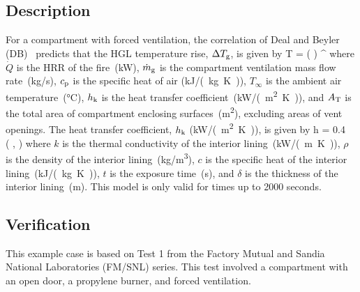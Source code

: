 \subsection*{Description}

For a compartment with forced ventilation, the correlation of Deal and Beyler (DB)~\cite{SFPE:Walton} predicts that the HGL temperature rise, $\Delta T\sb{g}$, is given by
\be
\Delta T = \left(  \right) \quad ^
\label{eq:DB}
\ee
where $\dot Q$ is the HRR of the fire~(\si{kW}), $\dot m\sb{g}$ is the compartment ventilation mass flow rate~(\si{kg/s}), $c\sb{p}$ is the specific heat of air (\si{kJ/(kg.K)}), $T_\infty$ is the ambient air temperature~(\si{\celsius}), $h\sb{k}$ is the heat transfer coefficient~(\si{kW/(m^2.K)}), and $A\sb{T}$ is the total area of compartment enclosing surfaces~(\si{m^2}), excluding areas of vent openings. The heat transfer coefficient, $h\sb{k}$ (\si{kW/(m^2.K)}), is given by
\be
h = 0.4\  \left(  ,  \right)
\label{eq:DB_hk}
\ee
where $k$ is the thermal conductivity of the interior lining~(\si{kW/(m.K)}), $\rho$ is the density of the interior lining~(\si{kg/m^3}), $c$ is the specific heat of the interior lining~(\si{kJ/(kg.K)}), $t$ is the exposure time~(\si{\second}), and $\delta$ is the thickness of the interior lining~(\si{m}). This model is only valid for times up to 2000 seconds.


\clearpage


\subsection*{Verification}

This example case is based on Test 1 from the Factory Mutual and Sandia National Laboratories (FM/SNL) series. This test involved a compartment with an open door, a propylene burner, and forced ventilation.

